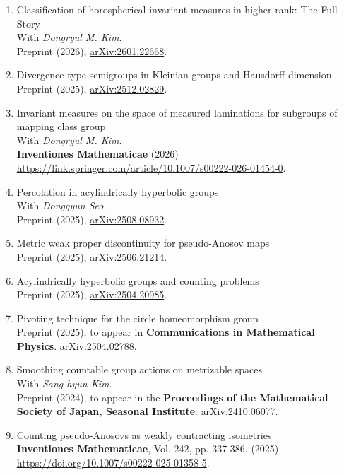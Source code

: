 \documentclass[a4paper, 10pt]{article}
\begin{document}
\begin{enumerate}
\item Classification of horospherical invariant measures in higher rank: The Full Story \\
With {\it Dongryul M. Kim}.\\
Preprint (2026), \href{https://arxiv.org/abs/2601.22668}{arXiv:2601.22668}.
\item Divergence-type semigroups in Kleinian groups and Hausdorff dimension \\
Preprint (2025),  \href{https://arxiv.org/abs/2512.02829}{arXiv:2512.02829}.
\item Invariant measures on the space of measured laminations for subgroups of mapping class group \\
With {\it Dongryul M. Kim}.\\
{\bf Inventiones Mathematicae} (2026) \url{https://link.springer.com/article/10.1007/s00222-026-01454-0}.
\item Percolation in acylindrically hyperbolic groups \\
With {\it Donggyun Seo}.\\
Preprint (2025), \href{https://arxiv.org/abs/2508.08932}{arXiv:2508.08932}.
\item Metric weak proper discontinuity for pseudo-Anosov maps \\
Preprint (2025),  \href{https://arxiv.org/abs/2506.21214}{arXiv:2506.21214}.
\item Acylindrically hyperbolic groups and counting problems \\
Preprint (2025), \href{https://arxiv.org/pdf/2504.20985}{arXiv:2504.20985}.
\item Pivoting technique for the circle homeomorphism group %
\\
Preprint (2025), to appear in {\bf Communications in Mathematical Physics}. \href{https://arxiv.org/abs/2504.02788}{arXiv:2504.02788}.
\item Smoothing countable group actions on metrizable spaces \\
With {\it Sang-hyun Kim}.\\
Preprint (2024), to appear in the {\bf Proceedings of the Mathematical Society of Japan, Seasonal Institute}. \href{https://arxiv.org/abs/2410.06077}{arXiv:2410.06077}.
\item Counting pseudo-Anosovs as weakly contracting isometries \\
{\bf Inventiones Mathematicae}, Vol. 242, pp. 337-386. (2025) \url{https://doi.org/10.1007/s00222-025-01358-5}.

\end{enumerate}
\end{document}
